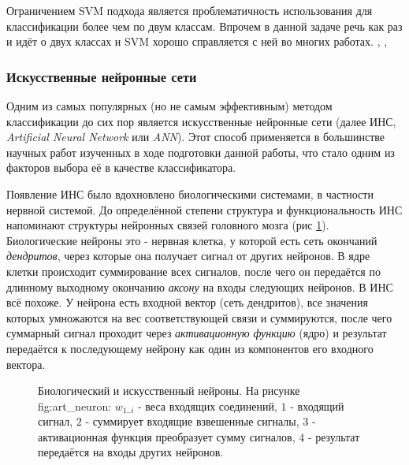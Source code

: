 \documentclass[12pt]{report}
\begin{document}
Ограничением SVM подхода является проблематичность использования для классификации более чем по двум классам. Впрочем в 
данной задаче речь как раз и идёт о двух классах и SVM хорошо справляется с ней во многих работах. \citep
{shavers2006svm}, \citep{jee2004eye}, \citep{saxena2008real}
\subsubsection{Искусственные нейронные сети}
Одним из самых популярных (но не самым эффективным) методом классификации до сих пор является искусственные нейронные 
сети (далее ИНС, \textit{Artificial Neural Network} или \textit{ANN}). Этот способ применяется в большинстве научных 
работ изученных в ходе подготовки данной работы, что стало одним из факторов выбора её в качестве классификатора. 

Появление ИНС было вдохновлено биологическими системами, в частности нервной системой. До определённой степени 
структура и функциональность ИНС напоминают структуры нейронных связей головного мозга (рис \ref{fig:neurons}). Биологические 
нейроны это - нервная клетка, у которой есть сеть окончаний \emph{дендритов}, через которые она получает сигнал от 
других нейронов. В ядре клетки происходит суммирование всех сигналов, после чего он передаётся по длинному выходному 
окончанию \emph{аксону} на входы следующих нейронов. В ИНС всё похоже. У нейрона есть входной вектор (сеть 
дендритов), все значения которых умножаются на вес соответствующей связи и суммируются, после чего суммарный сигнал 
проходит через \emph{активационную функцию} (ядро) и результат передаётся к последующему нейрону как один из 
компонентов его входного вектора. 

\begin{figure}[h]
	\centering
	\caption{Биологический  и искусственный  нейроны. На рисунке \subref
{fig:art_neuron}: $w_{1..i}$ - веса входящих соединений, $1$ - входящий сигнал, $2$ - суммирует входящие взвешенные 
сигналы, $3$ - активационная функция преобразует сумму сигналов, $4$ - результат передаётся на входы других 
нейронов.}
	\label{fig:neurons}
\end{figure}
\end{document}
